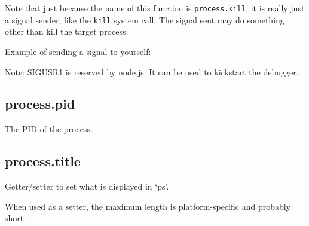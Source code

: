 Note that just because the name of this function is
\texttt{process.kill}, it is really just a signal sender, like the
\texttt{kill} system call. The signal sent may do something other than
kill the target process.

Example of sending a signal to yourself:

\begin{Shaded}
\begin{Highlighting}[]
\NormalTok{(}\NormalTok{, }\NormalTok{() \{}
  \NormalTok{(}\NormalTok{);}
\NormalTok{\});}

\NormalTok{() \{}
  \NormalTok{(}\NormalTok{);}
  \NormalTok{(}\NormalTok{);}
\NormalTok{\}, }\NormalTok{);}

\NormalTok{(}\NormalTok{, }\NormalTok{);}
\end{Highlighting}
\end{Shaded}

Note: SIGUSR1 is reserved by node.js. It can be used to kickstart the
debugger.

\subsection{process.pid}

The PID of the process.

\begin{Shaded}
\begin{Highlighting}[]
\NormalTok{(} \NormalTok{+ }\NormalTok{);}
\end{Highlighting}
\end{Shaded}

\subsection{process.title}

Getter/setter to set what is displayed in `ps'.

When used as a setter, the maximum length is platform-specific and
probably short.

